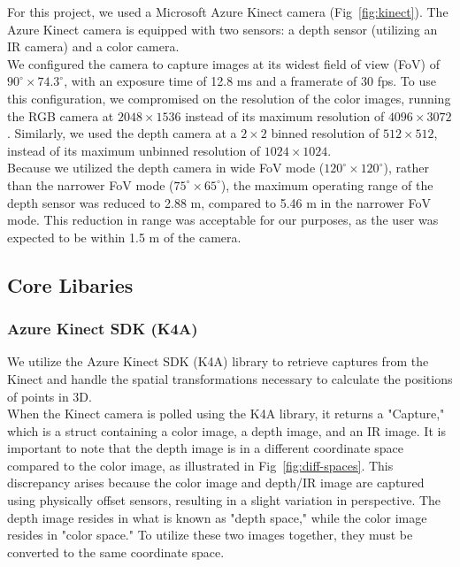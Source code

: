 For this project, we used a Microsoft Azure Kinect camera (Fig~\ref{fig:kinect}). The Azure Kinect camera is equipped with two sensors: a depth sensor (utilizing an IR camera) and a color camera. \\

We configured the camera to capture images at its widest field of view (FoV) of $90^{\circ} \times 74.3^{\circ}$, with an exposure time of 12.8 ms and a framerate of 30 fps. To use this configuration, we compromised on the resolution of the color images, running the RGB camera at $2048 \times 1536$ instead of its maximum resolution of $4096 \times 3072$. Similarly, we used the depth camera at a $2\times2$ binned resolution of $512 \times 512$, instead of its maximum unbinned resolution of $1024 \times 1024$. \\

Because we utilized the depth camera in wide FoV mode ($120^{\circ} \times 120^{\circ}$), rather than the narrower FoV mode ($75^{\circ} \times 65^{\circ}$), the maximum operating range of the depth sensor was reduced to 2.88 m, compared to 5.46 m in the narrower FoV mode. This reduction in range was acceptable for our purposes, as the user was expected to be within 1.5 m of the camera.


\subsection{Core Libaries}  

\subsubsection{Azure Kinect SDK (K4A)}

We utilize the Azure Kinect SDK (K4A) \cite{noauthor_microsoftazure-kinect-sensor-sdk_2024} library to retrieve captures from the Kinect and handle the spatial transformations necessary to calculate the positions of points in 3D. \\

When the Kinect camera is polled using the K4A library, it returns a "Capture," which is a struct containing a color image, a depth image, and an IR image. It is important to note that the depth image is in a different coordinate space compared to the color image, as illustrated in Fig~\ref{fig:diff-spaces}. This discrepancy arises because the color image and depth/IR image are captured using physically offset sensors, resulting in a slight variation in perspective. The depth image resides in what is known as "depth space," while the color image resides in "color space." To utilize these two images together, they must be converted to the same coordinate space. \\

